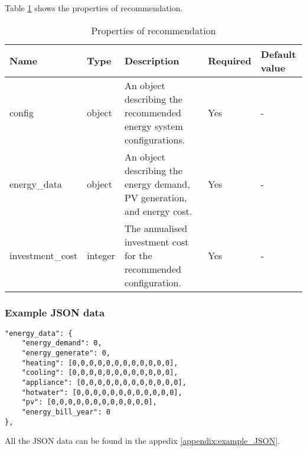Table \ref{tab:properties_recommendation} shows the properties of recommendation. 
\begin{table}[h!]
    \centering
    \small
    \begin{tabular}{ | p{} | p{} | p{} | p{} | p{} | } 
    \hline
    Name & Type & Description & Required & Default value \\
    \hline
    config & object & An object describing the recommended energy system configurations. & Yes & - \\
    \hline
    energy\_data & object & An object describing the energy demand, PV generation, and energy cost. & Yes & - \\
    \hline
    investment\_cost & integer & The annualised investment cost for the recommended configuration. & Yes & - \\
    \hline
    \end{tabular}
    \caption{Properties of recommendation}
    \label{tab:properties_recommendation}
\end{table}


\subsubsection{Example JSON data}

\begin{verbatim}
"energy_data": {
    "energy_demand": 0,
    "energy_generate": 0,
    "heating": [0,0,0,0,0,0,0,0,0,0,0,0],
    "cooling": [0,0,0,0,0,0,0,0,0,0,0,0],
    "appliance": [0,0,0,0,0,0,0,0,0,0,0,0],
    "hotwater": [0,0,0,0,0,0,0,0,0,0,0,0],
    "pv": [0,0,0,0,0,0,0,0,0,0,0,0],
    "energy_bill_year": 0
},
\end{verbatim}

All the JSON data can be found in the appedix \ref{appendix:example_JSON}. 
